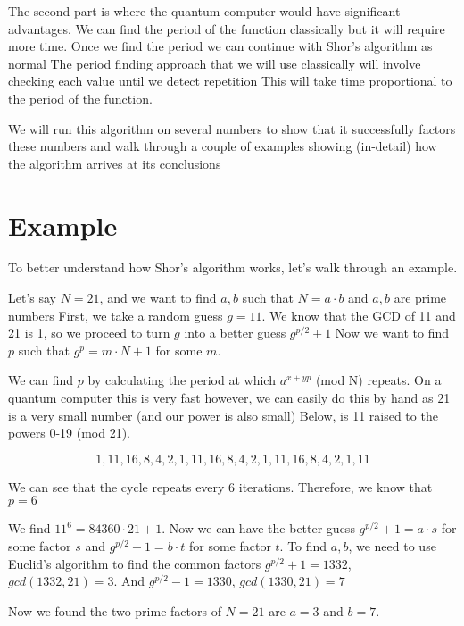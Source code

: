 \documentclass[a4paper]{article}
\begin{document}
The second part is where the quantum computer would have significant advantages. We can find the period of the function classically
 but it will require more time. Once we find the period we can continue with Shor's algorithm as normal
 The period finding approach that we will use classically will involve checking each value until we detect repetition
 This will take time proportional to the period of the function. 



We will run this algorithm on several numbers to show that it successfully factors these numbers and walk through a couple of examples showing (in-detail) how the algorithm arrives at its conclusions


\section{Example}

To better understand how Shor's algorithm works, let's walk through an example.



Let's say $N=21$, and we want to find $a, b$ such that $N = a \cdot b$ and $a, b$ are prime numbers
First, we take a random guess $g=11$. We know that the GCD of 11 and 21 is 1, so we proceed to turn $g$ into a better guess $g^{p/2} \pm 1$
 Now we want to find $p$ such that $g^p = m \cdot N + 1$ for some $m$.



We can find $p$ by calculating the period at which $a ^{x+ yp}$ (mod N) repeats. On a quantum computer this is very fast
 however, we can easily do this by hand as 21 is a very small number (and our power is also small)
 Below, is 11 raised to the powers 0-19 (mod 21).



$$1, 11, 16, 8, 4, 2, 1, 11, 16, 8, 4, 2, 1, 11, 16, 8, 4, 2, 1, 11$$ 



We can see that the cycle repeats every 6 iterations. Therefore, we know that $p = 6$


We find $11^ 6 = 84360 \cdot 21 + 1$. Now we can have the better guess $g^{p/2} + 1 = a \cdot s$ for some factor $s$
 and $g^{p/2} - 1 = b \cdot t$ for some factor $t$. To find $a,b$, we need to use Euclid's algorithm to find the common factors
$g^{p/2} + 1 = 1332$, $gcd(1332, 21) = 3$. And $g^{p/2} - 1 = 1330$, $gcd(1330, 21) = 7$


Now we found the two prime factors of $N=21$ are $a = 3$ and $b = 7$.



\newpage




\end{document}
